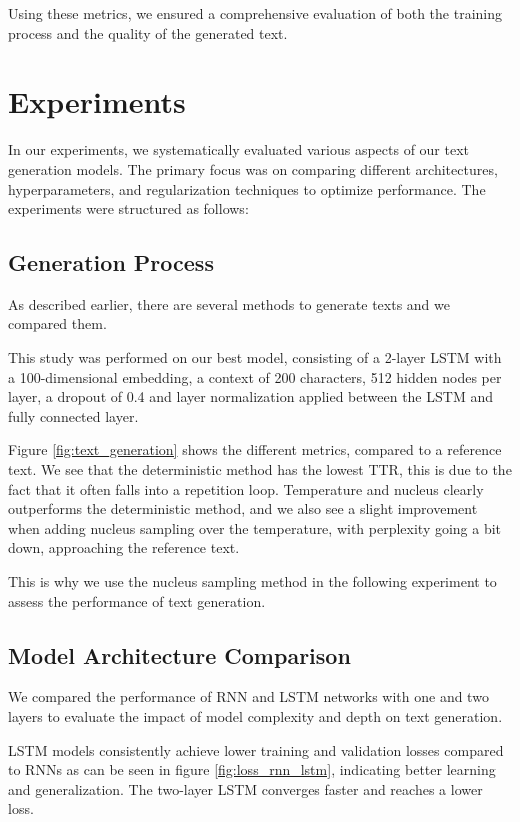\documentclass{article}
\begin{document}
Using these metrics, we ensured a comprehensive evaluation of both the training process and the quality of the generated text.


\section{Experiments}

In our experiments, we systematically evaluated various aspects of our text generation models. The primary focus was on comparing different architectures, hyperparameters, and regularization techniques to optimize performance. The experiments were structured as follows:

\subsection{Generation Process}\label{Generation study}

As described earlier, there are several methods to generate texts and we compared them. 

This study was performed on our best model, consisting of a 2-layer LSTM with a 100-dimensional embedding, a context of 200 characters, 512 hidden nodes per layer, a dropout of 0.4 and layer normalization applied between the LSTM and fully connected layer.

Figure \ref{fig:text_generation} shows the different metrics, compared to a reference text.
We see that the deterministic method has the lowest TTR, this is due to the fact that it often falls into a repetition loop. Temperature and nucleus clearly outperforms the deterministic method, and we also see a slight improvement when adding nucleus sampling over the temperature, with perplexity going a bit down, approaching the reference text.   

This is why we use the nucleus sampling method in the following experiment to assess the performance of text generation.

\subsection{Model Architecture Comparison}

We compared the performance of RNN and LSTM networks with one and two layers to evaluate the impact of model complexity and depth on text generation.

LSTM models consistently achieve lower training and validation losses compared to RNNs as can be seen in figure \ref{fig:loss_rnn_lstm}, indicating better learning and generalization. The two-layer LSTM converges faster and reaches a lower loss.
\end{document}

